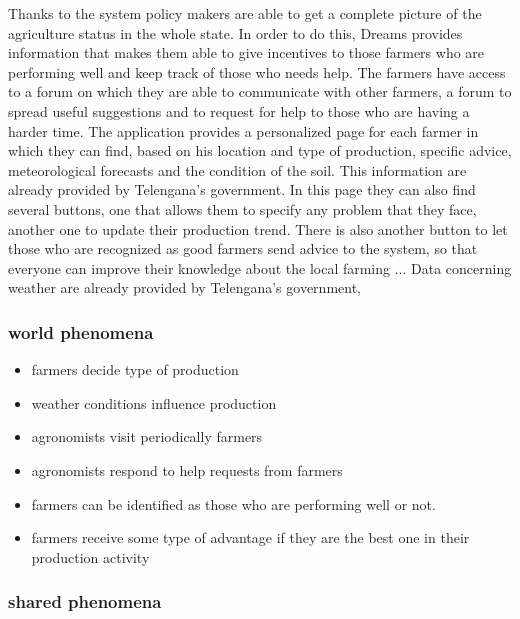\documentclass{article}
\begin{document}
    Thanks to the system policy makers are able to get a complete picture of the agriculture status in the whole state.
    In order to do this,  Dreams provides information that makes them able to give incentives to those farmers who are performing well and keep track of those who needs help.
    The farmers have access to a forum on which they are able to communicate with other farmers, a forum to spread useful suggestions and to request for help to those who are having a harder time.
    The application provides a personalized page for each farmer in which they can find, based on his location and type of production, specific advice, meteorological forecasts and the condition of the soil.
    This information are already provided by Telengana's government.
    In this page they can also find several buttons, one that allows them to specify any problem that they face,
    another one to update their production trend. There is also another button to let those who are recognized as good farmers send advice to the system, so that everyone can improve their knowledge about the local farming ...
    Data concerning weather are already provided by Telengana's government,

\subsubsection{world phenomena}
\begin{itemize}
    \item farmers decide type of production
    \item weather conditions influence production
    \item agronomists visit periodically farmers
    \item agronomists respond to help requests from farmers
    \item farmers can be identified as those who are performing well or not.
    \item farmers receive some type of advantage if they are the best one in their production activity
\end{itemize}

\subsubsection{shared phenomena}
\end{document}

